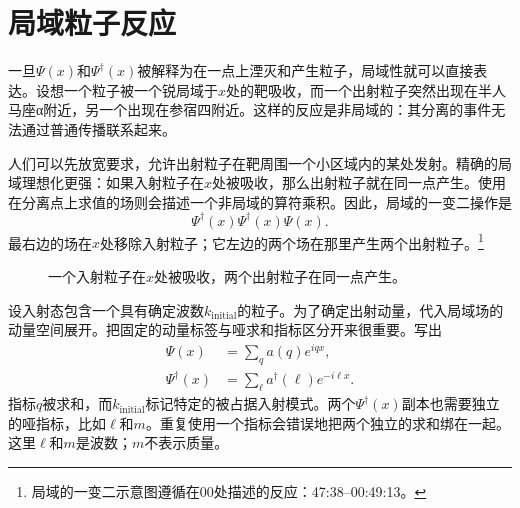 \begin{classroomqa}
\end{classroomqa}

\section{局域粒子反应}

一旦\(\Psi(x)\)和\(\Psi^\dagger(x)\)被解释为在一点上湮灭和产生粒子，局域性就可以直接表达。设想一个粒子被一个锐局域于\(x\)处的靶吸收，而一个出射粒子突然出现在半人马座{\proseunicodefont α}附近，另一个出现在参宿四附近。这样的反应是非局域的：其分离的事件无法通过普通传播联系起来。

人们可以先放宽要求，允许出射粒子在靶周围一个小区域内的某处发射。精确的局域理想化更强：如果入射粒子在\(x\)处被吸收，那么出射粒子就在同一点产生。使用在分离点上求值的场则会描述一个非局域的算符乘积。因此，局域的一变二操作是
\begin{equation}
\Psi^\dagger(x)\Psi^\dagger(x)\Psi(x).
\end{equation}
最右边的场在\(x\)处移除入射粒子；它左边的两个场在那里产生两个出射粒子。\footnote{局域的一变二示意图遵循在00处描述的反应：47:38--00:49:13。}

\begin{figure}[t]
\centering
{}
\caption{一个入射粒子在\(x\)处被吸收，两个出射粒子在同一点产生。}
\end{figure}

设入射态包含一个具有确定波数\(k_{\mathrm{initial}}\)的粒子。为了确定出射动量，代入局域场的动量空间展开。把固定的动量标签与哑求和指标区分开来很重要。写出
\begin{align}
\Psi(x)&=\sum_q a(q)e^{iqx},\\
\Psi^\dagger(x)&=\sum_\ell a^\dagger(\ell)e^{-i\ell x}.
\end{align}
指标\(q\)被求和，而\(k_{\mathrm{initial}}\)标记特定的被占据入射模式。两个\(\Psi^\dagger(x)\)副本也需要独立的哑指标，比如\(\ell\)和\(m\)。重复使用一个指标会错误地把两个独立的求和绑在一起。这里\(\ell\)和\(m\)是波数；\(m\)不表示质量。

